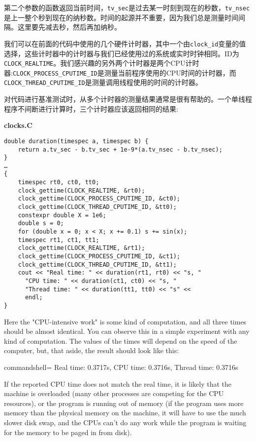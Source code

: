 第二个参数的函数返回当前时间，\texttt{tv\_sec}是过去某一时刻到现在的秒数，\texttt{tv\_nsec}是上一整个秒到现在的纳秒数。时间的起源并不重要，因为我们总是测量时间间隔。这里要先减去秒，然后再加纳秒。

我们可以在前面的代码中使用的几个硬件计时器，其中一个由\texttt{clock\_id}变量的值选择，这些计时器中的计时器与我们已经使用过的系统或实时时钟相同。ID为\texttt{CLOCK\_REALTIME}。我们感兴趣的另外两个计时器是两个CPU计时器:\texttt{CLOCK\_PROCESS\_CPUTIME\_ID}是测量当前程序使用的CPU时间的计时器，而\texttt{CLOCK\_THREAD\_CPUTIME\_ID}是测量调用线程使用的时间的计时器。

对代码进行基准测试时，从多个计时器的测量结果通常是很有帮助的。一个单线程程序不间断进行计算时，三个计时器应该返回相同的结果:

\noindent
\textbf{clocks.C}
\begin{lstlisting}[style=styleCXX]
double duration(timespec a, timespec b) {
	return a.tv_sec - b.tv_sec + 1e-9*(a.tv_nsec - b.tv_nsec);
}
…
{
	timespec rt0, ct0, tt0;
	clock_gettime(CLOCK_REALTIME, &rt0);
	clock_gettime(CLOCK_PROCESS_CPUTIME_ID, &ct0);
	clock_gettime(CLOCK_THREAD_CPUTIME_ID, &tt0);
	constexpr double X = 1e6;
	double s = 0;
	for (double x = 0; x < X; x += 0.1) s += sin(x);
	timespec rt1, ct1, tt1;
	clock_gettime(CLOCK_REALTIME, &rt1);
	clock_gettime(CLOCK_PROCESS_CPUTIME_ID, &ct1);
	clock_gettime(CLOCK_THREAD_CPUTIME_ID, &tt1);
	cout << "Real time: " << duration(rt1, rt0) << "s, "
	  "CPU time: " << duration(ct1, ct0) << "s, "
	  "Thread time: " << duration(tt1, tt0) << "s" <<
	  endl;
}
\end{lstlisting}

Here the "CPU-intensive work" is some kind of computation, and all three times should be almost identical. You can observe this in a simple experiment with any kind of computation. The values of the times will depend on the speed of the computer, but, that aside, the result should look like this:

\begin{tcblisting}{commandshell={}}
Real time: 0.3717s, CPU time: 0.3716s, Thread time: 0.3716s
\end{tcblisting}

If the reported CPU time does not match the real time, it is likely that the machine is overloaded (many other processes are competing for the CPU resources), or the program is running out of memory (if the program uses more memory than the physical memory on the machine, it will have to use the much slower disk swap, and the CPUs can't do any work while the program is waiting for the memory to be paged in from disk).

